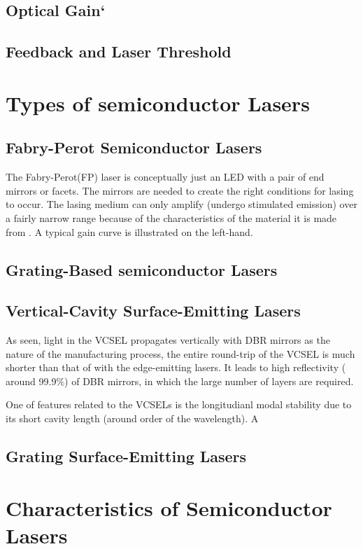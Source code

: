 \subsection{Optical Gain`}
\subsection{Feedback and Laser Threshold}
\section{Types of semiconductor Lasers} \label{corrections}
\subsection{Fabry-Perot Semiconductor Lasers}

The Fabry-Perot(FP) laser is conceptually just an LED with a pair of end
mirrors or facets. The mirrors are needed to create the right conditions for
lasing to occur. The lasing medium can only amplify (undergo stimulated
emission) over a fairly narrow range because of the characteristics of the
material it is made from . A typical gain curve is illustrated on the
left-hand. 

\subsection{Grating-Based semiconductor Lasers}
\subsection{Vertical-Cavity Surface-Emitting Lasers}

As seen, light in the VCSEL propagates vertically with DBR mirrors as the
nature of the manufacturing process, the entire round-trip of the VCSEL is much
shorter than that of with the edge-emitting lasers. It leads to high
reflectivity ( around 99.9$\%$) of DBR mirrors, in which the large number of
layers are required.

One of features related to the VCSELs is the longitudianl modal stability due
to its short cavity length (around order of the wavelength). A

\subsection{Grating Surface-Emitting Lasers}
\section{Characteristics of Semiconductor Lasers} \label{corrections}

